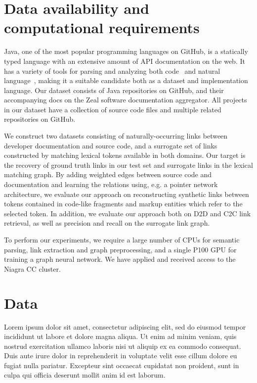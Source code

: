 \documentclass{article}
\begin{document}
\section{Data availability and computational requirements}

Java, one of the most popular programming languages on GitHub, is a statically typed language with an extensive amount of API documentation on the web. It has a variety of tools for parsing and analyzing both code~\citep{kovalenko2019pathminer} and natural language~\citep{manning2014stanford, grella2018non}, making it a suitable candidate both as a dataset and implementation language. Our dataset consists of Java repositories on GitHub, and their accompanying docs on the Zeal software documentation aggregator. All projects in our dataset have a collection of source code files and multiple related repositories on GitHub.

We construct two datasets consisting of naturally-occurring links between developer documentation and source code, and a surrogate set of links constructed by matching lexical tokens available in both domains. Our target is the recovery of ground truth links in our test set and surrogate links in the lexical matching graph. By adding weighted edges between source code and documentation and learning the relations using, e.g. a pointer network architecture, we evaluate our approach on reconstructing synthetic links between tokens contained in code-like fragments and markup entities which refer to the selected token. In addition, we evaluate our approach both on D2D and C2C link retrieval, as well as precision and recall on the surrogate link graph.

To perform our experiments, we require a large number of CPUs for semantic parsing, link extraction and graph preprocessing, and a single P100 GPU for training a graph neural network. We have applied and received access to the Niagra CC cluster.

\section{Data}

Lorem ipsum dolor sit amet, consectetur adipiscing elit, sed do eiusmod tempor incididunt ut labore et dolore magna aliqua. Ut enim ad minim veniam, quis nostrud exercitation ullamco laboris nisi ut aliquip ex ea commodo consequat. Duis aute irure dolor in reprehenderit in voluptate velit esse cillum dolore eu fugiat nulla pariatur. Excepteur sint occaecat cupidatat non proident, sunt in culpa qui officia deserunt mollit anim id est laborum.
\end{document}
